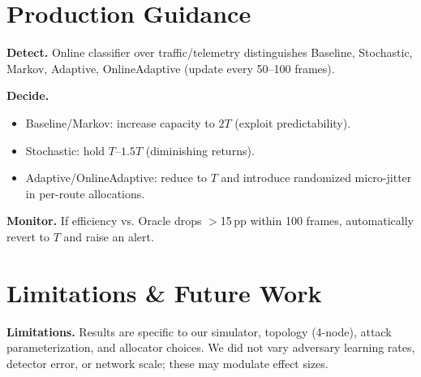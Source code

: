 \documentclass[11pt,a4paper]{article}
\begin{document}
\section{Production Guidance}
\begin{tcolorbox}[colback=criticalcolor!08,colframe=criticalcolor,title=Threat-Responsive Capacity Control]
\textbf{Detect.} Online classifier over traffic/telemetry distinguishes Baseline, Stochastic, Markov, Adaptive, OnlineAdaptive (update every 50–100 frames).

\textbf{Decide.} 
\begin{itemize}\itemsep2pt
\item Baseline/Markov: increase capacity to $2T$ (exploit predictability).
\item Stochastic: hold $T$–$1.5T$ (diminishing returns).
\item Adaptive/OnlineAdaptive: reduce to $T$ and introduce randomized micro-jitter in per-route allocations.
\end{itemize}

\textbf{Monitor.} If efficiency vs. Oracle drops $>$15\,pp within 100 frames, automatically revert to $T$ and raise an alert.
\end{tcolorbox}

\section{Limitations \& Future Work}
\textbf{Limitations.} Results are specific to our simulator, topology (4-node), attack parameterization, and allocator choices. We did not vary adversary learning rates, detector error, or network scale; these may modulate effect sizes.
\end{document}
